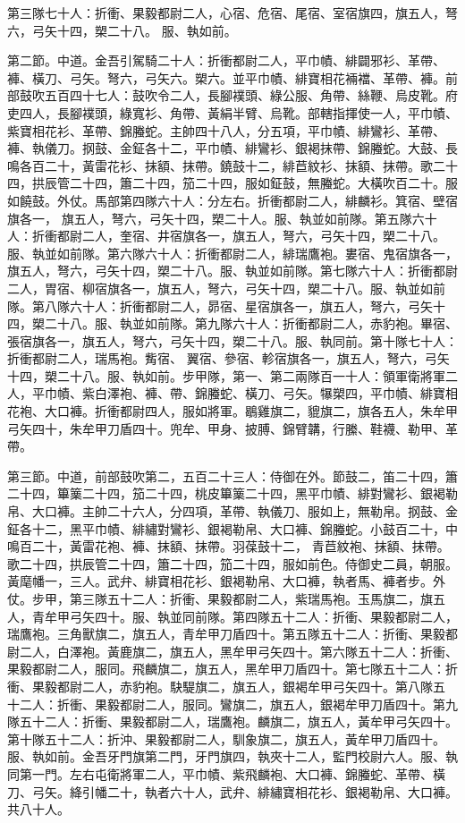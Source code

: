 \begin{pinyinscope}
 第三隊七十人：折衝、果毅都尉二人，心宿、危宿、尾宿、室宿旗四，旗五人，弩六，弓矢十四，槊二十八。
 服、執如前。



 第二節。中道。金吾引駕騎二十人：折衝都尉二人，平巾幘、緋闢邪衫、革帶、褲、橫刀、弓矢。弩六，弓矢六。槊六。並平巾幘、緋寶相花裲襠、革帶、褲。前部鼓吹五百四十七人：鼓吹令二人，長腳襆頭、綠公服、角帶、絲鞭、烏皮靴。府吏四人，長腳襆頭，綠寬衫、角帶、黃絹半臂、烏靴。部轄指揮使一人，平巾幘、紫寶相花衫、革帶、錦螣蛇。主帥四十八人，分五項，平巾幘、緋鸞衫、革帶、褲、執儀刀。㧏鼓、金鉦各十二，平巾幘、緋鸞衫、銀褐抹帶、錦螣蛇。大鼓、長鳴各百二十，黃雷花衫、抹額、抹帶。鐃鼓十二，緋苣紋衫、抹額、抹帶。歌二十四，拱辰管二十四，簫二十四，笳二十四，服如鉦鼓，無螣蛇。大橫吹百二十。服如饒鼓。外仗。馬部第四隊六十人：分左右。折衝都尉二人，緋麟衫。箕宿、壁宿旗各一，
 旗五人，弩六，弓矢十四，槊二十人。服、執並如前隊。第五隊六十人：折衝都尉二人，奎宿、井宿旗各一，旗五人，弩六，弓矢十四，槊二十八。服、執並如前隊。第六隊六十人：折衝都尉二人，緋瑞鷹袍。婁宿、鬼宿旗各一，旗五人，弩六，弓矢十四，槊二十八。服、執並如前隊。第七隊六十人：折衝都尉二人，胃宿、柳宿旗各一，旗五人，弩六，弓矢十四，槊二十八。服、執並如前隊。第八隊六十人：折衝都尉二人，昴宿、星宿旗各一，旗五人，弩六，弓矢十四，槊二十八。服、執並如前隊。第九隊六十人：折衝都尉二人，赤豹袍。畢宿、張宿旗各一，旗五人，弩六，弓矢十四，槊二十八。服、執同前。第十隊七十人：折衝都尉二人，瑞馬袍。觜宿、
 翼宿、參宿、軫宿旗各一，旗五人，弩六，弓矢十四，槊二十八。服、執如前。步甲隊，第一、第二兩隊百一十人：領軍衛將軍二人，平巾幘、紫白澤袍、褲、帶、錦螣蛇、橫刀、弓矢。犦槊四，平巾幘、緋寶相花袍、大口褲。折衝都尉四人，服如將軍。鶡雞旗二，貔旗二，旗各五人，朱牟甲弓矢四十，朱牟甲刀盾四十。兜牟、甲身、披膊、錦臂韝，行縢、鞋襪、勒甲、革帶。



 第三節。中道，前部鼓吹第二，五百二十三人：侍御在外。節鼓二，笛二十四，簫二十四，篳篥二十四，笳二十四，桃皮篳篥二十四，黑平巾幘、緋對鸞衫、銀褐勒帛、大口褲。主帥二十六人，分四項，革帶、執儀刀、服如上，無勒帛。㧏鼓、金鉦各十二，黑平巾幘、緋繡對鸞衫、銀褐勒帛、大口褲、錦螣蛇。小鼓百二十，中鳴百二十，黃雷花袍、褲、抹額、抹帶。羽葆鼓十二，
 青苣紋袍、抹額、抹帶。歌二十四，拱辰管二十四，簫二十四，笳二十四，服如前色。侍御史二員，朝服。黃麾幡一，三人。武弁、緋寶相花衫、銀褐勒帛、大口褲，執者馬、褲者步。外仗。步甲，第三隊五十二人：折衝、果毅都尉二人，紫瑞馬袍。玉馬旗二，旗五人，青牟甲弓矢四十。服、執並同前隊。第四隊五十二人：折衝、果毅都尉二人，瑞鷹袍。三角獸旗二，旗五人，青牟甲刀盾四十。第五隊五十二人：折衝、果毅都尉二人，白澤袍。黃鹿旗二，旗五人，黑牟甲弓矢四十。第六隊五十二人：折衝、果毅都尉二人，服同。飛麟旗二，旗五人，黑牟甲刀盾四十。第七隊五十二人：折衝、果毅都尉二人，赤豹袍。駃騠旗二，旗五人，銀褐牟甲弓矢四十。第八隊五
 十二人：折衝、果毅都尉二人，服同。鸞旗二，旗五人，銀褐牟甲刀盾四十。第九隊五十二人：折衝、果毅都尉二人，瑞鷹袍。麟旗二，旗五人，黃牟甲弓矢四十。第十隊五十二人：折沖、果毅都尉二人，馴象旗二，旗五人，黃牟甲刀盾四十。服、執如前。金吾牙門旗第二門，牙門旗四，執夾十二人，監門校尉六人。服、執同第一門。左右屯衛將軍二人，平巾幘、紫飛麟袍、大口褲、錦螣蛇、革帶、橫刀、弓矢。絳引幡二十，執者六十人，武弁、緋繡寶相花衫、銀褐勒帛、大口褲。共八十人。




\end{pinyinscope}

